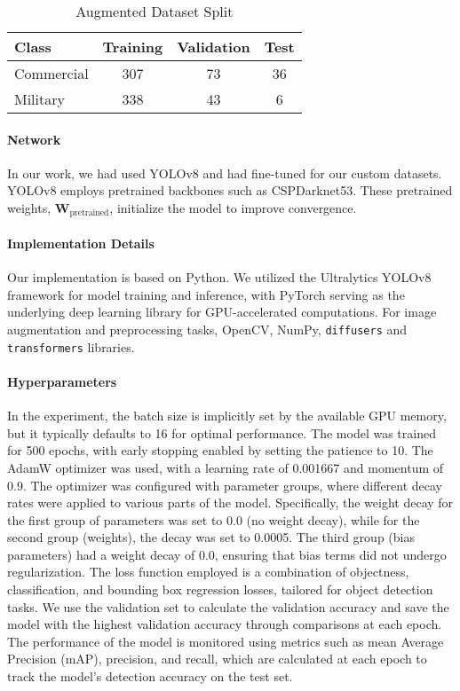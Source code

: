 \begin{table}
\small
\centering
\caption{Augmented Dataset Split}

\setlength\tabcolsep{4pt}
\begin{tabular}{lccc}
\toprule
Class & Training&Validation&Test\\ \midrule
Commercial &307 & 73 & 36    \\
Military& 338 & 43 & 6 \\ 
\bottomrule
\end{tabular}
\vspace{0pt}

\label{tab:augmented-split}
\end{table}

\paragraph{Network} In our work, we had used YOLOv8 and had fine-tuned for our custom datasets. YOLOv8 employs pretrained backbones such as CSPDarknet53. These pretrained weights, $\mathbf{W}_\text{pretrained}$, initialize the model to improve convergence.

\paragraph{Implementation Details}
Our implementation is based on Python. We utilized the Ultralytics YOLOv8 framework for model training and inference, with PyTorch serving as the underlying deep learning library for GPU-accelerated computations. For image augmentation and preprocessing tasks, OpenCV, NumPy, \texttt{diffusers} and \texttt{transformers} libraries.

\paragraph{Hyperparameters}
In the experiment, the batch size is implicitly set by the available GPU memory, but it typically defaults to 16 for optimal performance. The model was trained for 500 epochs, with early stopping enabled by setting the patience to 10. The AdamW optimizer was used, with a learning rate of 0.001667 and momentum of 0.9. The optimizer was configured with parameter groups, where different decay rates were applied to various parts of the model. Specifically, the weight decay for the first group of parameters was set to 0.0 (no weight decay), while for the second group (weights), the decay was set to 0.0005. The third group (bias parameters) had a weight decay of 0.0, ensuring that bias terms did not undergo regularization. The loss function employed is a combination of objectness, classification, and bounding box regression losses, tailored for object detection tasks. We use the validation set to calculate the validation accuracy and save the model with the highest validation accuracy through comparisons at each epoch. The performance of the model is monitored using metrics such as mean Average Precision (mAP), precision, and recall, which are calculated at each epoch to track the model’s detection accuracy on the test set.

